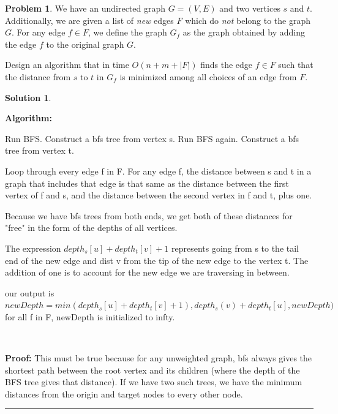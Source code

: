 \documentclass{article}
\theoremstyle{definition}
\newtheorem{problem}{Problem}
\def\fline{\rule{0.75\linewidth}{0.5pt}}
\newcommand{\finishline}{\begin{center}\fline\end{center}}
\newtheorem*{solution*}{Solution}
\newenvironment{solution}{\begin{solution*}}{{\finishline} \end{solution*}}
\begin{document}
\newpage





\begin{problem}
	We have an undirected graph $G=(V,E)$ and two vertices $s$ and $t$. Additionally, we are given a list of \emph{new} edges $F$ which do \emph{not} belong to the graph $G$. For any edge $f \in F$, 
	we define the graph $G_f$ as the graph obtained by adding the edge $f$ to the original graph $G$. 
	
	Design an algorithm that in time $O(n+m+|{F}|)$ finds the edge $f \in F$ such that 
	the distance from $s$ to $t$ in $G_f$ is minimized among all choices of an edge from $F$.  
\end{problem}



\begin{solution}

    \

    \textbf{Algorithm: }

    Run BFS. Construct a bfs tree from vertex s. 
    Run BFS again. Construct a bfs tree from vertex t.

    Loop through every edge f in F. For any edge f, the distance between s and t in a graph that includes that edge is that same as the distance between the first vertex of f and s, and the distance between the second vertex in f and t, plus one.

    Because we have bfs trees from both ends, we get both of these distances for "free" in the form of the depths of all vertices.

    The expression $depth_s[u] + depth_t[v] + 1$ represents going from s to the tail end of the new edge and dist v from the tip of the new edge to the vertex t. The addition of one is to account for the new edge we are traversing in between. 

    our output is $newDepth = min(depth_s[u] + depth_t[v] + 1),depth_s(v)+depth_t[u], newDepth)$ for all f in F, newDepth is initialized to infty.

    
    \

    \textbf{Proof: }
    This must be true because for any unweighted graph, bfs always gives the shortest path between the root vertex and its children (where the depth of the BFS tree gives that distance). 
    If we have two such trees, we have the minimum distances from the origin and target nodes to every other node. 


\end{solution}
\end{document}

